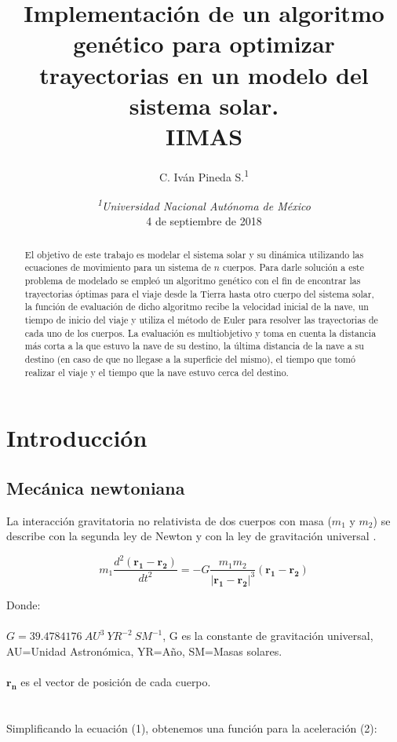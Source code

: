 \documentclass[12pt,letterpaper]{article}
\author{C. Iván Pineda S.\textsuperscript{1} }
\title{Implementación de un algoritmo genético para optimizar trayectorias en un modelo del sistema solar.\\ IIMAS}
\date {\textit{\textsuperscript{1}Universidad Nacional Autónoma de México}
\\ 4 de septiembre de 2018}
\begin{document}
\maketitle

\begin{abstract}
El objetivo de este trabajo es modelar el sistema solar y su dinámica utilizando las ecuaciones de movimiento para  un sistema de $n $ cuerpos. Para darle solución a este problema de modelado se empleó un algoritmo genético con el fin de encontrar las trayectorias óptimas para el viaje desde la Tierra hasta otro cuerpo del sistema solar, la función de evaluación de dicho algoritmo recibe la velocidad inicial de la nave, un tiempo de inicio del viaje y utiliza el método de Euler para resolver las trayectorias de cada uno de los cuerpos. La evaluación es multiobjetivo y toma en cuenta la distancia más corta a la que estuvo la nave de su destino, la última distancia de la nave a su destino (en caso de que no llegase a la superficie del mismo), el tiempo que tomó realizar el viaje y el tiempo que la nave estuvo cerca del destino.
\end{abstract}


\section*{Introducción}

\subsection*{Mecánica newtoniana}

La interacción gravitatoria no relativista de dos cuerpos con masa ($m_1$ y $m_2$) se describe con la segunda ley de Newton y con la ley de gravitación universal \citep{jose2000classical}.

\begin{equation}
 m_1\dfrac{d ^2 \mathbf{(r_1 - r_2)}}{d t^2}=-G\dfrac{m_1m_2}{|\mathbf{r_{1}}-\mathbf{r_2}|^3}(\mathbf{r_{1}}-\mathbf{r_2})
\end{equation} 

Donde:
\\
\\
$G=39.4784176 \ AU^3 \ YR^{-2} \ SM^{-1}$, G es la constante de gravitación universal, AU=Unidad Astronómica, YR=Año, SM=Masas solares.
\\
\\
$\mathbf{r_n} $ es el vector de posición de cada cuerpo.
\\
\\
\\
Simplificando la ecuación (1), obtenemos una función para la aceleración (2):
\end{document}
